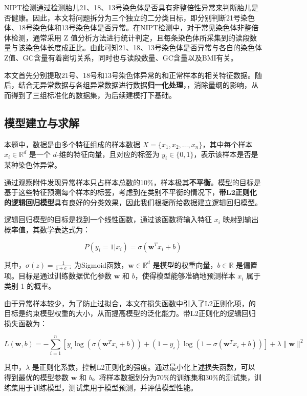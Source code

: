 \documentclass[12pt]{ctexart}
\begin{document}
	NIPT检测通过检测胎儿21、18、13号染色体是否具有非整倍性异常来判断胎儿是否健康。因此，本文将问题拆分为三个独立的二分类目标，即分别判断21号染色体、18号染色体和13号染色体是否异常。在NIPT检测中，对于常见染色体非整倍体检测，通常采用 Z 值分析方法进行统计判定，且每条染色体所采集到的读段数量与该染色体长度成正比。由此可知21、18、13号染色体是否异常与各自的染色体Z值、GC含量有着密切关系，同时也与读段数量、GC含量以及BMI有关。
	
	本文首先分别提取21号、18号和13号染色体异常的和正常样本的相关特征数据。随后，结合无异常数据与各组异常数据进行数据\textbf{归一化处理}，，消除量纲的影响，从而得到了三组标准化的数据集，为后续建模打下基础。
	
	\subsection{模型建立与求解}
	
	本题中，数据是由多个特征组成的样本数据 \( X = \{x_1, x_2, \dots, x_n\} \)，其中每个样本 \( x_i \in \mathbb{R}^d \) 是一个 \( d \)-维的特征向量，且对应的标签为 \( y_i \in \{0, 1\} \)，表示该样本是否是某种染色体异常。
	
	通过观察附件发现异常样本只占样本总数的10\%，样本极其\textbf{不平衡}。模型的目标是基于这些特征预测每个样本的标签，考虑到在类别不平衡的情况下，\textbf{带L2正则化的逻辑回归模型}具有良好的分类效果，因此我们根据所给数据建立逻辑回归模型。
	
	逻辑回归模型的目标是找到一个线性函数，通过该函数将输入特征 \( x_i \) 映射到输出概率值，其数学表达式为：
	
	\begin{equation}
	P(y_i = 1 | x_i) = \sigma(\mathbf{w}^T x_i + b)
	\end{equation}
	
	其中，\( \sigma(z) = \frac{1}{1 + e^{-z}} \) 为Sigmoid函数，\( \mathbf{w} \in \mathbb{R}^d \) 是模型的权重向量，\( b \in \mathbb{R} \) 是偏置项。目标是通过训练数据优化参数 \( \mathbf{w} \) 和 \( b \)，使得模型能够准确地预测样本 \( x_i \) 属于类别 1 的概率。
	
	由于异常样本较少，为了防止过拟合，本文在损失函数中引入了L2正则化项，的目标是约束模型权重的大小，从而提高模型的泛化能力。带L2正则化的逻辑回归损失函数为：
	
	\[
	L(\mathbf{w}, b) = -\sum_{i=1}^{n} \left[ y_i \log(\sigma(\mathbf{w}^T x_i + b)) + (1 - y_i) \log(1 - \sigma(\mathbf{w}^T x_i + b)) \right] + \lambda \|\mathbf{w}\|^2
	\]
	
	其中，\( \lambda \) 是正则化系数，控制L2正则化的强度。通过最小化上述损失函数，可以得到最优的模型参数 \( \mathbf{w} \) 和 \( b \)。将样本数据划分为70\%的训练集和30\%的测试集，训练集用于训练模型，测试集用于模型预测，并评估模型性能。
	
\end{document}
